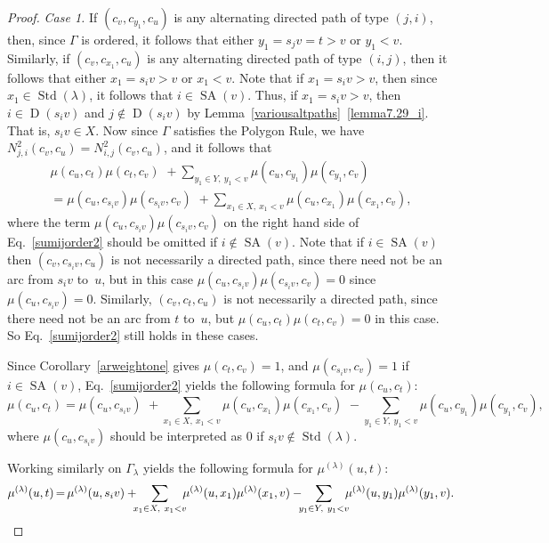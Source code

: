 \documentclass[ALCO,ThmDefs,Unicode,epreuves]{cedram}
\newenvironment{Case}[1]{\smallskip\noindent\emph{Case #1}\endgraf
 \nobreak\noindent\ignorespaces}{\endgraf\smallskip}
\DeclareMathOperator{\STD}{Std}
\DeclareMathOperator{\SA}{SA}
\DeclareMathOperator{\D}{D}
\newcommand*{\Mk}{\mkern -2mu}
\begin{document}
\begin{proof}
\begin{Case}{1.}
If $(c_v,c_{y_1},c_{u})$ is any alternating directed path of type $(j,i)$, then, since
$\Gamma$ is ordered, it follows that either $y_1=s_jv=t>v$ or $y_1<v$. Similarly, if
$(c_v,c_{x_1},c_{u})$ is any alternating directed path of type $(i,j)$, then
it follows that either $x_1=s_iv>v$ or $x_1<v$. Note that
if $x_1=s_iv>v$, then since $x_1\in\STD(\lambda)$, it follows that
$i\in\SA(v)$. Thus, if $x_1=s_iv>v$, then
$i\in\D(s_iv)$ and $j\notin\D(s_iv)$ by Lemma~\ref{variousaltpaths}~\ref{lemma7.29_i}. That is,
$s_iv\in X$. Now since $\Gamma$ satisfies the
Polygon Rule,
we have
$N^{2}_{j,i}(c_{v},c_{u})=N^{2}_{i,j}(c_{v},c_{u})$, and it follows that
\begin{multline}\label{sumijorder2}
\mu(c_{u},c_{t})\mu(c_{t},c_v)\,\, +
\!\!\!\!\sum_{y_1\in Y,\ y_1<v}\!\!\!\!\mu(c_{u},c_{y_{1}})\mu(c_{y_{1}},c_v)\\[-5pt]
=\mu(c_{u},c_{s_iv})\mu(c_{s_iv},c_v)\,\, +
\!\!\!\!\sum_{x_1\in X,\ x_1<v}\!\!\!\!\mu(c_{u},c_{x_1})\mu(c_{x_1},c_v),
\end{multline}
where the term $\mu(c_{u},c_{s_iv})\mu(c_{s_iv},c_v)$ on the right hand side of
Eq.~\eqref{sumijorder2} should be omitted if $i\notin\SA(v)$. Note that if $i\in\SA(v)$
then $(c_v,c_{s_iv},c_{u})$ is not necessarily a directed path, since there need not
be an arc from $s_iv$ to~$u$, but in this case
$\mu(c_{u},c_{s_iv})\mu(c_{s_iv},c_v)=0$ since $\mu(c_{u},c_{s_iv})=0$. Similarly,
$(c_v,c_{t},c_{u})$ is not necessarily a directed path, since there need not be an arc
from $t$ to~$u$, but $\mu(c_{u},c_{t})\mu(c_{t},c_v)=0$ in this case.
So Eq.~\eqref{sumijorder2} still holds in these cases.

Since Corollary~\ref{arweightone} gives $\mu(c_{t},c_v)= 1$, and $\mu(c_{s_iv},c_v)= 1$
if $i\in\SA(v)$,
Eq.~\eqref{sumijorder2} yields the following formula for $\mu(c_{u},c_{t})$:
\begin{equation*}
\mu(c_{u},c_{t}) =\mu(c_{u},c_{s_iv})\,\, +
\!\!\!\sum_{x_1\in X,\ x_1<v}\!\!\!\mu(c_{u},c_{x_1})\mu(c_{x_1},c_v)\,\,-
\!\!\!\sum_{y_1\in Y,\ y_1<v}\!\!\!\mu(c_{u},c_{y_1})\mu(c_{y_1},c_v),
\end{equation*}
where $\mu(c_{u},c_{s_iv})$ should be interpreted as 0 if $s_iv\notin\STD(\lambda)$.

Working similarly on $\Gamma_{\lambda}$ yields the following formula for
$\mu^{(\lambda)}(u,t)$:
\begin{equation*}
\mu^{(\lambda)}(u,t) \Mk=\Mk\mu^{(\lambda)}(u,s_iv)
+\!\!\!\sum_{x_1\in X,\ x_1<v}\!\!\!\mu^{(\lambda)}(u,x_1)\mu^{(\lambda)}(x_1,v)
-\!\!\!\sum_{y_1\in Y,\ y_1<v}\!\!\!\mu^{(\lambda)}(u,y_1)\mu^{(\lambda)}(y_1,v).
\end{equation*}


\end{Case}
\end{proof}
\end{document}
